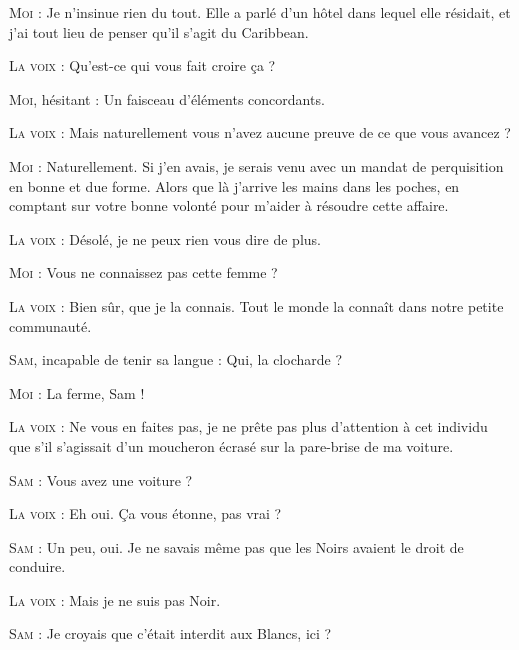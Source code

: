 \begin{dialogue}
\textsc{Moi} : Je n’insinue rien du tout. Elle a parlé d’un hôtel dans lequel elle résidait, et j’ai tout lieu de penser qu’il s’agit du Caribbean.

\textsc{La voix} : Qu’est-ce qui vous fait croire ça ?

\textsc{Moi}, hésitant : Un faisceau d’éléments concordants.

\textsc{La voix} : Mais naturellement vous n’avez aucune preuve de ce que vous avancez ?

\textsc{Moi} : Naturellement. Si j’en avais, je serais venu avec un mandat de perquisition en bonne et due forme. Alors que là j’arrive les mains dans les poches, en comptant sur votre bonne volonté pour m’aider à résoudre cette affaire.

\textsc{La voix} : Désolé, je ne peux rien vous dire de plus.

\textsc{Moi} : Vous ne connaissez pas cette femme ?

\textsc{La voix} : Bien sûr, que je la connais. Tout le monde la connaît dans notre petite communauté.

\textsc{Sam}, incapable de tenir sa langue : Qui, la clocharde ?

\textsc{Moi} : La ferme, Sam !

\textsc{La voix} : Ne vous en faites pas, je ne prête pas plus d’attention à cet individu que s’il s’agissait d’un moucheron écrasé sur la pare-brise de ma voiture.

\textsc{Sam} : Vous avez une voiture ?

\textsc{La voix} : Eh oui. Ça vous étonne, pas vrai ?

\textsc{Sam} : Un peu, oui. Je ne savais même pas que les Noirs avaient le droit de conduire.

\textsc{La voix} : Mais je ne suis pas Noir.

\textsc{Sam} : Je croyais que c’était interdit aux Blancs, ici ?

%


\end{dialogue}
